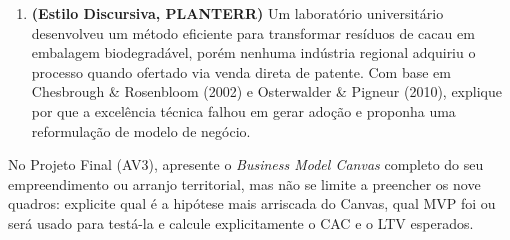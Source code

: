 \begin{enumerate}[leftmargin=1.5em, itemsep=6pt]
  \item \textbf{(Estilo Discursiva, PLANTERR)} Um laboratório universitário desenvolveu um método eficiente para transformar resíduos de cacau em embalagem biodegradável, porém nenhuma indústria regional adquiriu o processo quando ofertado via venda direta de patente. Com base em Chesbrough \& Rosenbloom (2002) e Osterwalder \& Pigneur (2010), explique por que a excelência técnica falhou em gerar adoção e proponha uma reformulação de modelo de negócio.
  \espacoResolucao[2.4cm]
\end{enumerate}

\begin{boxDica}
  No Projeto Final (AV3), apresente o \textit{Business Model Canvas} completo do seu empreendimento ou arranjo territorial, mas não se limite a preencher os nove quadros: explicite qual é a hipótese mais arriscada do Canvas, qual MVP foi ou será usado para testá-la e calcule explicitamente o CAC e o LTV esperados.
\end{boxDica}

\clearpage
{}

